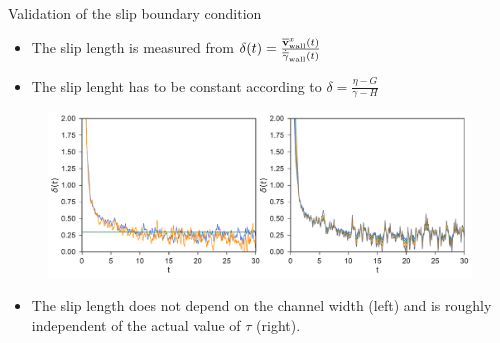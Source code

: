 \documentclass{beamer}
\begin{document}
\begin{frame}{Validation of the slip boundary condition}
  \begin{itemize}
    \item The slip length is measured from 
 $\delta(t)=\frac{\overline{\bf v}^x_{\rm wall}(t)}{\dot{\overline{\gamma}}_{\rm wall}(t)}$
\item The slip lenght has to be constant according to 
  $\delta =\frac{\eta -G}{\gamma-H}$
  \end{itemize}
  \begin{figure}[]
\includegraphics[width=\linewidth]{Slipt-17nodes-WALLS}
  \end{figure}
  \begin{itemize}
    \item The slip length does not depend on the channel width (left) and is roughly independent of the actual value of $\tau$ (right).
  \end{itemize}
\end{frame}
\end{document}
